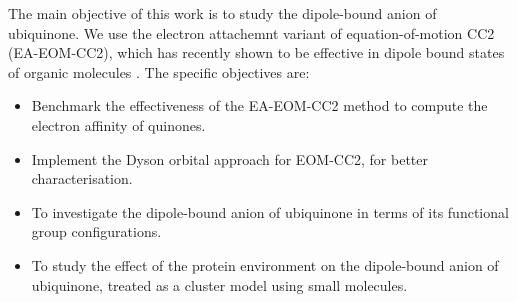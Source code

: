 The main objective of this work is to study the dipole-bound anion of ubiquinone. We use the electron attachemnt variant of equation-of-motion CC2 (EA-EOM-CC2), which has recently shown to be effective in dipole bound states of organic molecules \cite{paran2024performance}. The specific objectives are:
\begin{itemize}
  \item Benchmark the effectiveness of the EA-EOM-CC2 method to compute the electron affinity of quinones.
  \item Implement the Dyson orbital approach for EOM-CC2, for better characterisation.
  \item To investigate the dipole-bound anion of ubiquinone in terms of its functional group configurations.
  \item To study the effect of the protein environment on the dipole-bound anion of ubiquinone, treated as a cluster model using small molecules.
\end{itemize}

\cleardoublepage

